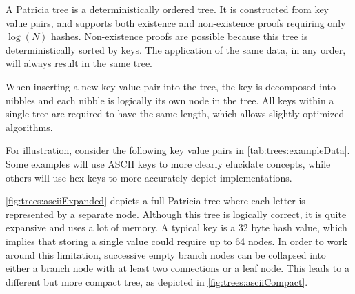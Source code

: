 A Patricia tree\cite{Morrison1968} is a deterministically ordered tree.
It is constructed from key value pairs, and supports both existence and non-existence proofs requiring only $\log(N)$ hashes.
Non-existence proofs are possible because this tree is deterministically sorted by keys.
The application of the same data, in any order, will always result in the same tree.

When inserting a new key value pair into the tree, the key is decomposed into nibbles and each nibble is logically its own node in the tree.
All keys within a single tree are required to have the same length, which allows slightly optimized algorithms.

For illustration, consider the following key value pairs in \autoref{tab:trees:exampleData}.
Some examples will use ASCII keys to more clearly elucidate concepts, while others will use hex keys to more accurately depict \codenamespace implementations.

\autoref{fig:trees:asciiExpanded} depicts a full Patricia tree where each letter is represented by a separate node.
Although this tree is logically correct, it is quite expansive and uses a lot of memory.
A typical key is a 32 byte hash value, which implies that storing a single value could require up to 64 nodes.
In order to work around this limitation, successive empty branch nodes can be collapsed into either a branch node with at least two connections or a leaf node.
This leads to a different but more compact tree, as depicted in \autoref{fig:trees:asciiCompact}.

\begin{table}[ht]
\end{table}

\begin{figure}[H]
\end{figure}

